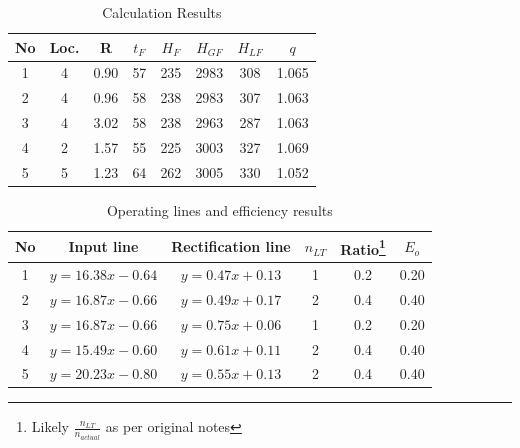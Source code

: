 \begin{table}[H]
    \centering
    \caption{Calculation Results}
    \label{tab:calculations}
    \begin{tabular}{cccccccc}
        \toprule
        \textbf{No} & \textbf{Loc.} & \textbf{R} & \textbf{$t_F$} & \textbf{$H_F$} & \textbf{$H_{GF}$} & \textbf{$H_{LF}$} & \textbf{$q$} \\
        \midrule
        1           & 4             & 0.90       & 57             & 235            & 2983              & 308               & 1.065        \\
        2           & 4             & 0.96       & 58             & 238            & 2983              & 307               & 1.063        \\
        3           & 4             & 3.02       & 58             & 238            & 2963              & 287               & 1.063        \\
        4           & 2             & 1.57       & 55             & 225            & 3003              & 327               & 1.069        \\
        5           & 5             & 1.23       & 64             & 262            & 3005              & 330               & 1.052        \\
        \bottomrule
    \end{tabular}
\end{table}

\begin{table}[H]
    \centering
    \caption{Operating lines and efficiency results}
    \label{tab:lines}
    \begin{tabular}{cccccc}
        \toprule
        \textbf{No} & \textbf{Input line}  & \textbf{Rectification line} & \textbf{$n_{LT}$} & \textbf{Ratio\footnote{Likely $\frac{n_{LT}}{n_{actual}}$ as per original notes}} & \textbf{$E_o$} \\
        \midrule
        1           & $y = 16.38x - 0.64$  & $y = 0.47x + 0.13$          & 1                 & 0.2 & 0.20          \\
        2           & $y = 16.87x - 0.66$  & $y = 0.49x + 0.17$          & 2                 & 0.4 & 0.40          \\
        3           & $y = 16.87x - 0.66$  & $y = 0.75x + 0.06$          & 1                 & 0.2 & 0.20          \\
        4           & $y = 15.49x - 0.60$  & $y = 0.61x + 0.11$          & 2                 & 0.4 & 0.40          \\
        5           & $y = 20.23x - 0.80$  & $y = 0.55x + 0.13$          & 2                 & 0.4 & 0.40          \\
        \bottomrule
    \end{tabular}
\end{table}

